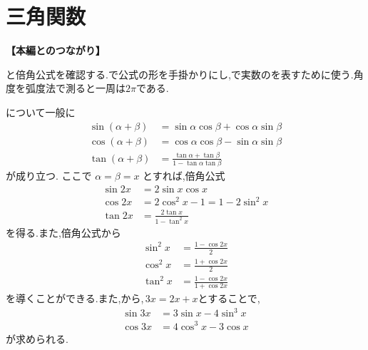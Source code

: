 \section{三角関数}\label{節：三角関数}
  \noindent\textbf{【本編とのつながり】}\par
  と倍角公式を確認する.で公式の形を手掛かりにし,で実数のを表すために使う.角度を弧度法で測ると一周は$2\pi$である.

  について一般に
  \begin{align*}
    \sin(\alpha+\beta)
      &=\sin\alpha\cos\beta+\cos\alpha\sin\beta\\
    \cos(\alpha+\beta)
      &=\cos\alpha\cos\beta-\sin\alpha\sin\beta\\
    \tan(\alpha+\beta)
      &=\frac{\tan\alpha+\tan\beta}
              {1-\tan\alpha\tan\beta}
  \end{align*}
  が成り立つ.
  ここで $\alpha=\beta=x$ とすれば,倍角公式
  \begin{align*}
    \sin 2x&=2\sin x\cos x\\
    \cos 2x&=2\cos^2x-1=1-2\sin^2x\\
    \tan 2x&=\frac{2\tan x}{1-\tan^2x}
  \end{align*}
  を得る.また,倍角公式から
  \begin{align*}
    \sin^2x&=\frac{1-\cos 2x}{2}\\
    \cos^2x&=\frac{1+\cos 2x}{2}\\
    \tan^2x&=\frac{1-\cos 2x}{1+\cos 2x}
  \end{align*}
  を導くことができる.また,から,\,$3x=2x+x$とすることで,
  \begin{align*}
    \sin 3x&=3\sin x-4\sin^3x\\
    \cos 3x&=4\cos^3x-3\cos x
  \end{align*}
  が求められる.
